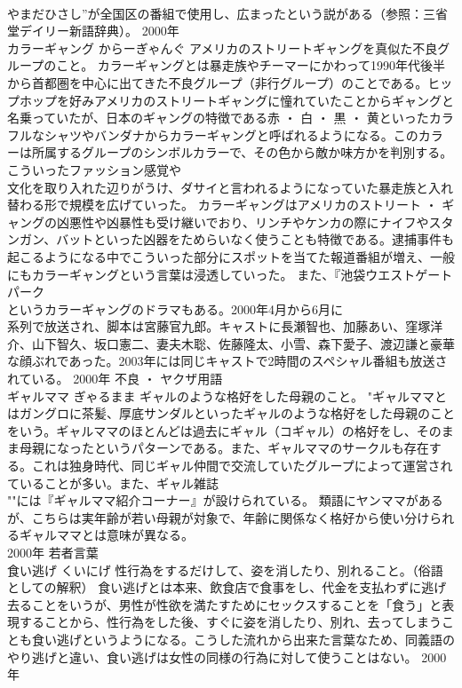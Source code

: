 \documentclass[8pt]{extreport}
\begin{document}
\begin{CJK}{UTF8}{min}
\\	やまだひさし”が全国区の番組で使用し、広まったという説がある（参照：三省堂デイリー新語辞典）。	2000年	
\\	カラーギャング	からーぎゃんぐ	アメリカのストリートギャングを真似た不良グループのこと。	カラーギャングとは暴走族やチーマーにかわって1990年代後半から首都圏を中心に出てきた不良グループ（非行グループ）のことである。ヒップホップを好みアメリカのストリートギャングに憧れていたことからギャングと名乗っていたが、日本のギャングの特徴である赤 ・ 白 ・ 黒 ・ 黄といったカラフルなシャツやバンダナからカラーギャングと呼ばれるようになる。このカラーは所属するグループのシンボルカラーで、その色から敵か味方かを判別する。こういったファッション感覚や
\\	文化を取り入れた辺りがうけ、ダサイと言われるようになっていた暴走族と入れ替わる形で規模を広げていった。 カラーギャングはアメリカのストリート ・ ギャングの凶悪性や凶暴性も受け継いでおり、リンチやケンカの際にナイフやスタンガン、バットといった凶器をためらいなく使うことも特徴である。逮捕事件も起こるようになる中でこういった部分にスポットを当てた報道番組が増え、一般にもカラーギャングという言葉は浸透していった。 また、『池袋ウエストゲートパーク 
\\	というカラーギャングのドラマもある。2000年4月から6月に
\\	系列で放送され、脚本は宮藤官九郎。キャストに長瀬智也、加藤あい、窪塚洋介、山下智久、坂口憲二、妻夫木聡、佐藤隆太、小雪、森下愛子、渡辺謙と豪華な顔ぶれであった。2003年には同じキャストで2時間のスペシャル番組も放送されている。	2000年	不良 ・ ヤクザ用語	
\\	ギャルママ	ぎゃるまま	ギャルのような格好をした母親のこと。	"ギャルママとはガングロに茶髪、厚底サンダルといったギャルのような格好をした母親のことをいう。ギャルママのほとんどは過去にギャル（コギャル）の格好をし、そのまま母親になったというパターンである。また、ギャルママのサークルも存在する。これは独身時代、同じギャル仲間で交流していたグループによって運営されていることが多い。また、ギャル雑誌
\\	""には『ギャルママ紹介コーナー』が設けられている。 類語にヤンママがあるが、こちらは実年齢が若い母親が対象で、年齢に関係なく格好から使い分けられるギャルママとは意味が異なる。
\\	2000年	若者言葉	
\\	食い逃げ	くいにげ	性行為をするだけして、姿を消したり、別れること。（俗語としての解釈）	食い逃げとは本来、飲食店で食事をし、代金を支払わずに逃げ去ることをいうが、男性が性欲を満たすためにセックスすることを「食う」と表現することから、性行為をした後、すぐに姿を消したり、別れ、去ってしまうことも食い逃げというようになる。こうした流れから出来た言葉なため、同義語のやり逃げと違い、食い逃げは女性の同様の行為に対して使うことはない。	2000年	

\end{CJK}
\end{document}
